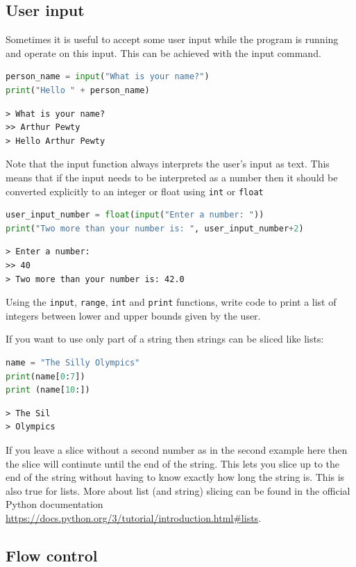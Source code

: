 	\subsection{User input}
		Sometimes it is useful to accept some user input while the program is running and operate on this input. This can be achieved with the input command.
		\begin{lstlisting}[language=Python]
person_name = input("What is your name?")
print("Hello " + person_name)\end{lstlisting}
		\begin{verbatim}
> What is your name?
>> Arthur Pewty
> Hello Arthur Pewty\end{verbatim}
		Note that the input function always interprets the user's input as text. This means that if the input needs to be interpreted as a number then it should be converted explicitly to an integer or float using \texttt{int} or \texttt{float}
		\begin{lstlisting}[language=Python]
user_input_number = float(input("Enter a number: "))
print("Two more than your number is: ", user_input_number+2)\end{lstlisting}
		\begin{verbatim}
> Enter a number: 
>> 40
> Two more than your number is: 42.0\end{verbatim}
\begin{task}Using the \texttt{input}, \texttt{range}, \texttt{int} and \texttt{print} functions, write code to print a list of integers between lower and upper bounds given by the user.\end{task}
If you want to use only part of a string then strings can be sliced like lists:
		\begin{lstlisting}[language=Python]
name = "The Silly Olympics"
print(name[0:7])
print (name[10:])\end{lstlisting}
\begin{verbatim}
> The Sil
> Olympics\end{verbatim}
If you leave a slice without a second number as in the second example here then the slice will continute until the end of the string. This lets you slice up to the end of the string without having to know exactly how long the string is. This is also true for lists. More about list (and string) slicing can be found in the official Python documentation \url{https://docs.python.org/3/tutorial/introduction.html#lists}.
	\subsection{Flow control}
